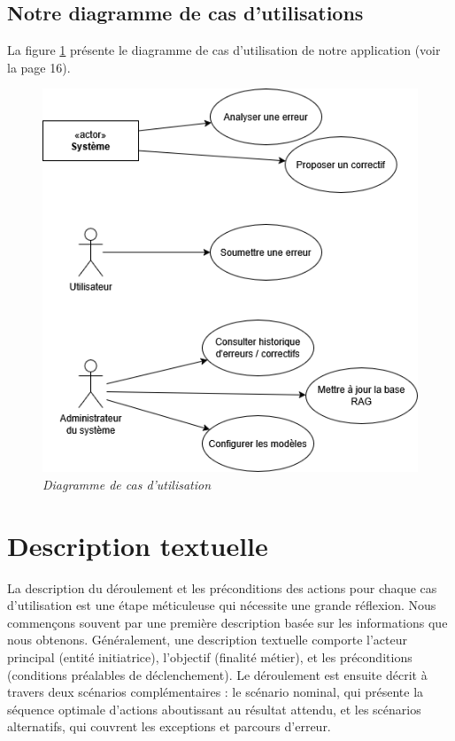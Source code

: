\documentclass[12pt,a4paper]{report}
\begin{document}
	\subsection{Notre diagramme de cas d'utilisations}
	
	La figure \ref{fig:use-case} présente le diagramme de cas d'utilisation de notre application (voir la page 16).
	
	\begin{figure}[H]
		\centering
		\includegraphics{use-case.drawio.png}
		\caption{\textit{Diagramme de cas d'utilisation}}
		\label{fig:use-case}
	\end{figure}
	
	\section{Description textuelle}
	
	La description du déroulement et les préconditions des actions pour chaque cas d'utilisation est une étape méticuleuse qui nécessite une grande réflexion. Nous commençons souvent par une première description basée sur les informations que nous obtenons.
	Généralement, une description textuelle comporte l'acteur principal (entité initiatrice), l'objectif (finalité métier), et les préconditions (conditions préalables de déclenchement). Le déroulement est ensuite décrit à travers deux scénarios complémentaires : le scénario nominal, qui présente la séquence optimale d'actions aboutissant au résultat attendu, et les scénarios alternatifs, qui couvrent les exceptions et parcours d'erreur.
	
\end{document}
